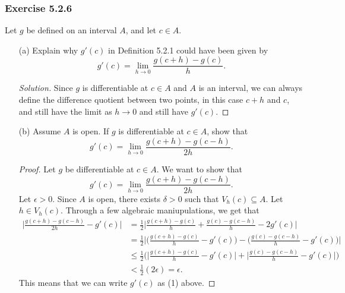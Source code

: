\subsubsection{Exercise 5.2.6} 
Let \( g  \) be defined on an interval \( A  \), and let \( c \in A  \).
\begin{enumerate}
    \item[(a)] Explain why \( g'(c)  \) in Definition 5.2.1 could have been given by
        \[  g'(c) = \lim_{ h \to 0 } \frac{ g(c + h) - g(c)  }{ h }. \]
        \begin{proof}[Solution]
        Since \( g  \) is differentiable at \( c \in A  \) and \( A  \) is an interval, we can always define the difference quotient between two points, in this case \( c + h  \) and \( c  \), and still have the limit as \( h \to 0  \) and still have \( g'(c) \).
        \end{proof}
    \item[(b)] Assume \( A  \) is open. If \( g  \) is differentiable at \( c \in A  \), show that 
        \[  g'(c) = \lim_{ h \to 0 } \frac{ g(c+h) - g(c-h)  }{ 2h }. \]
        \begin{proof}
            Let \( g  \) be differentiable at \( c \in A  \). We want to show that 
            \[  g'(c) = \lim_{ h \to 0 } \frac{ g(c+h) - g(c-h)  }{ 2h } \tag{1}.\]
            Let \( \epsilon > 0  \). Since \( A  \) is open, there exists \( \delta > 0  \) such that
            \( V_{h}(c) \subseteq A  \). Let \( h \in V_{h}(c)  \). Through a few algebraic maniupulations, we get that
            \begin{align*}
                \Big| \frac{ g(c+h) - g(c-h)  }{ 2h  } - g'(c)  \Big| &= \frac{ 1 }{ 2 } \Big| \frac{ g(c+h) - g(c)  }{ h  } + \frac{ g(c) - g(c-h)  }{ h } - 2 g'(c)  \Big|   \\
                                                                      &= \frac{ 1 }{ 2 } \Big| \Big( \frac{ g(c+h) - g(c)  }{ h } - g'(c)  \Big) - \Big( \frac{ g(c) - g(c-h)  }{ h } - g'(c) \Big) \Big| \\
                                                                      &\leq \frac{ 1 }{ 2 } \Big( \Big|  \frac{ g(c+h) - g(c)  }{ h } - g'(c) \Big| + \Big| \frac{ g(c) - g(c - h)  }{ h } - g'(c)   \Big|  \Big) \\
                                                                      &< \frac{ 1 }{ 2 } ( 2 \epsilon ) = \epsilon.
            \end{align*}
            This means that we can write \( g'(c)  \) as (1) above.
        \end{proof}
\end{enumerate}


